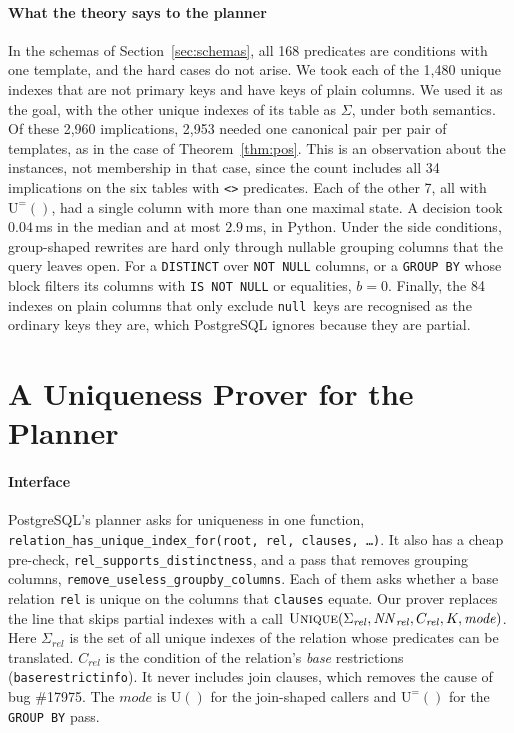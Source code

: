 \documentclass[conference]{IEEEtran}
\theoremstyle{definition}
\newcommand{\sql}[1]{\texttt{#1}}
\newcommand{\nul}{\texttt{null}}
\newcommand{\NN}{\mathit{NN}}
\newcommand{\Sig}{\Sigma}
\newcommand{\U}[1]{\mathrm{U}(#1)}
\newcommand{\Ueq}[1]{\mathrm{U}^{=}(#1)}
\begin{document}
\paragraph*{What the theory says to the planner} In the schemas of Section~\ref{sec:schemas}, all 168 predicates are
conditions with one template, and the hard cases do not arise. We took each of the 1{,}480 unique indexes that are not
primary keys and have keys of plain columns. We used it as the goal, with the other unique indexes of its table as
$\Sig$, under both semantics. Of these 2{,}960 implications, 2{,}953 needed one canonical pair per pair of templates, as
in the case of Theorem~\ref{thm:pos}. This is an observation about the instances, not membership in that case, since the count
includes all 34 implications on the six tables with \sql{<>} predicates. Each of the other 7, all with $\Ueq{}$, had a single column with
more than one maximal state. A decision took $0.04$\,ms in the median and at most $2.9$\,ms, in Python. Under the side
conditions, group-shaped rewrites are hard only through nullable grouping columns that the query leaves open. For a
\sql{DISTINCT} over \sql{NOT NULL} columns, or a \sql{GROUP BY} whose block filters its columns with \sql{IS NOT NULL} or
equalities, $b=0$. Finally, the 84 indexes on plain columns that only exclude \nul\ keys are recognised as the ordinary
keys they are, which PostgreSQL ignores because they are partial.

\section{A Uniqueness Prover for the Planner}\label{sec:planner}

\paragraph*{Interface} PostgreSQL's planner asks for uniqueness in one function,
\sql{relation\_has\_unique\_index\_for(root, rel, clauses, \ldots)}. It also has a cheap pre-check,
\sql{rel\_supports\_distinctness}, and a pass that removes grouping columns, \sql{remove\_useless\_groupby\_columns}. Each
of them asks whether a base relation \sql{rel} is unique on the columns that \sql{clauses} equate. Our prover replaces the
line that skips partial indexes with a call
$\textsc{Unique}(\Sig_{\mathit{rel}}, \NN_{\mathit{rel}}, C_{\mathit{rel}}, K, \mathit{mode})$.
Here $\Sig_{\mathit{rel}}$ is the set of all unique indexes of the relation whose predicates can be translated.
$C_{\mathit{rel}}$ is the condition of the relation's \emph{base} restrictions (\sql{baserestrictinfo}). It never includes
join clauses, which removes the cause of bug \#17975. The $\mathit{mode}$ is $\U{}$ for the join-shaped callers and
$\Ueq{}$ for the \sql{GROUP BY} pass.
\end{document}
